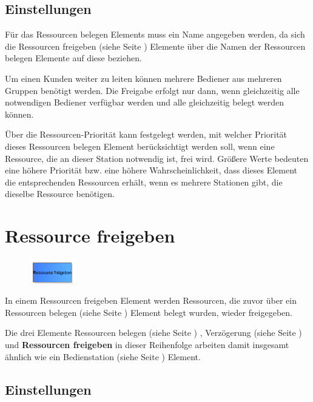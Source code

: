 \subsection*{Einstellungen}

Für das Ressourcen belegen Elements muss ein Name angegeben werden, da sich die
Ressourcen freigeben (siehe Seite \pageref{ref:ModelElementRelease}) Elemente über die Namen
der Ressourcen belegen Elemente auf diese beziehen.

Um einen Kunden weiter zu leiten können mehrere Bediener aus mehreren Gruppen benötigt werden. Die Freigabe erfolgt
nur dann, wenn gleichzeitig alle notwendigen Bediener verfügbar werden und alle gleichzeitig belegt werden können.

Über die Ressourcen-Priorität kann festgelegt werden, mit welcher Priorität dieses Ressourcen belegen Element
berücksichtigt werden soll, wenn eine Ressource, die an dieser Station notwendig ist,
frei wird. Größere Werte bedeuten eine höhere Priorität bzw. eine höhere Wahrscheinlichkeit, dass dieses Element
die entsprechenden Ressourcen erhält, wenn es mehrere Stationen gibt, die dieselbe Ressource benötigen.


\section{Ressource freigeben}
\label{ref:ModelElementRelease}

\begin{figure}
\vspace{-22pt}
\includegraphics[width=2cm]{imageModelElementRelease.png}
\vspace{-22pt}
\end{figure}

In einem Ressourcen freigeben Element werden Ressourcen, die zuvor über ein Ressourcen belegen (siehe Seite \pageref{ref:ModelElementSeize}) 
Element belegt wurden, wieder freigegeben.

Die drei Elemente Ressourcen belegen (siehe Seite \pageref{ref:ModelElementSeize}) , Verzögerung (siehe Seite \pageref{ref:ModelElementDelay}) und
\textbf{Ressourcen freigeben} in dieser Reihenfolge arbeiten damit
insgesamt ähnlich wie ein Bedienstation (siehe Seite \pageref{ref:ModelElementProcess}) Element.

\subsection*{Einstellungen}

